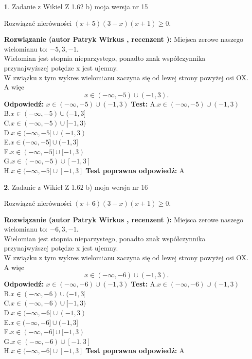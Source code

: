 \documentclass[12pt, a4paper]{article}
\theoremstyle{definition} %
\newtheorem{zad}{}
\newcommand{\zadStart}[1]{\begin{zad}#1\newline}
\newcommand{\zadStop}{\end{zad}}
\newcommand{\rozwStart}[2]{\noindent \textbf{Rozwiązanie (autor #1 , recenzent #2): }\newline}
\newcommand{\rozwStop}{\newline}
\newcommand{\odpStart}{\noindent \textbf{Odpowiedź:}\newline}
\newcommand{\odpStop}{\newline}
\newcommand{\testStart}{\noindent \textbf{Test:}\newline}
\newcommand{\testStop}{\newline}
\newcommand{\kluczStart}{\noindent \textbf{Test poprawna odpowiedź:}\newline}
\newcommand{\kluczStop}{\newline}
\begin{document}
\zadStart{Zadanie z Wikieł Z 1.62 b) moja wersja nr 15}

Rozwiązać nierówności $(x+5)(3-x)(x+1)\ge0$.
\zadStop
\rozwStart{Patryk Wirkus}{}
Miejsca zerowe naszego wielomianu to: $-5, 3, -1$.\\
Wielomian jest stopnia nieparzystego, ponadto znak współczynnika przy\linebreak najwyższej potędze x jest ujemny.\\ W związku z tym wykres wielomianu zaczyna się od lewej strony powyżej osi OX. A więc $$x \in (-\infty,-5) \cup (-1,3).$$
\rozwStop
\odpStart
$x \in (-\infty,-5) \cup (-1,3)$
\odpStop
\testStart
A.$x \in (-\infty,-5) \cup (-1,3)$\\
B.$x \in (-\infty,-5) \cup (-1,3]$\\
C.$x \in (-\infty,-5) \cup [-1,3)$\\
D.$x \in (-\infty,-5] \cup (-1,3)$\\
E.$x \in (-\infty,-5] \cup (-1,3]$\\
F.$x \in (-\infty,-5] \cup [-1,3)$\\
G.$x \in (-\infty,-5) \cup [-1,3]$\\
H.$x \in (-\infty,-5] \cup [-1,3]$
\testStop
\kluczStart
A
\kluczStop



\zadStart{Zadanie z Wikieł Z 1.62 b) moja wersja nr 16}

Rozwiązać nierówności $(x+6)(3-x)(x+1)\ge0$.
\zadStop
\rozwStart{Patryk Wirkus}{}
Miejsca zerowe naszego wielomianu to: $-6, 3, -1$.\\
Wielomian jest stopnia nieparzystego, ponadto znak współczynnika przy\linebreak najwyższej potędze x jest ujemny.\\ W związku z tym wykres wielomianu zaczyna się od lewej strony powyżej osi OX. A więc $$x \in (-\infty,-6) \cup (-1,3).$$
\rozwStop
\odpStart
$x \in (-\infty,-6) \cup (-1,3)$
\odpStop
\testStart
A.$x \in (-\infty,-6) \cup (-1,3)$\\
B.$x \in (-\infty,-6) \cup (-1,3]$\\
C.$x \in (-\infty,-6) \cup [-1,3)$\\
D.$x \in (-\infty,-6] \cup (-1,3)$\\
E.$x \in (-\infty,-6] \cup (-1,3]$\\
F.$x \in (-\infty,-6] \cup [-1,3)$\\
G.$x \in (-\infty,-6) \cup [-1,3]$\\
H.$x \in (-\infty,-6] \cup [-1,3]$
\testStop
\kluczStart
A
\kluczStop
\end{document}
